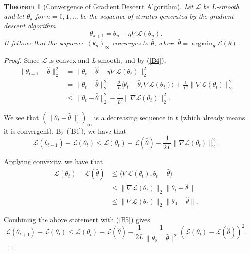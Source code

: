 \documentclass[a4paper,11pt,titlepage]{article}
\DeclareMathOperator*{\argmin}{argmin}
\theoremstyle{definition}
\theoremstyle{plain}
\newtheorem{theorem}{Theorem}[section]
\theoremstyle{remark}
\begin{document}
\begin{theorem}[Convergence of Gradient Descent Algorithm]
    Let $\mathcal{L}$ be $L$-smooth and let $\theta_n$ for $n = 0, 1, \dots$ be the sequence of iterates generated by the gradient descent algorithm
    $$
    \theta_{n+1} = \theta_{n} - \eta \nabla \mathcal{L}(\theta_n).
    $$
    It follows that the sequence $(\theta_n)_\infty$ converges to $\hat{\theta}$, where $\hat{\theta} = \argmin_\theta \mathcal{L}(\theta)$.
\end{theorem}
\begin{proof}
    Since $\mathcal{L}$ is convex and $L$-smooth, and by (\ref{B4}),
    \begin{align*}
        \|\theta_{t+1} - \hat{\theta}\|_2^2 &= \|\theta_{t} - \hat{\theta} - \eta \nabla \mathcal{L}(\theta_t)\|_2^2 \\
        &= \|\theta_{t} - \hat{\theta}\|_2^2 - \frac{2}{L}\langle \theta_t - \hat{\theta}, \nabla \mathcal{L}(\theta_t)\rangle + \frac{1}{L^2}\|\nabla \mathcal{L}(\theta_t)\|_2^2 \\
        &\leq \| \theta_t - \hat{\theta}\|_2^2 - \frac{1}{L^2}\|\nabla \mathcal{L}(\theta_t)\|_2^2.
    \end{align*}
    
    We see that $(\|\theta_t - \hat{\theta}\|_2^2)_\infty$ is a decreasing sequence in $t$ (which already means it is convergent). By (\ref{B1}), we have that
    \begin{equation}
    \mathcal{L}(\theta_{t+1}) - \mathcal{L}(\theta_t) \leq \mathcal{L}(\theta_t) - \mathcal{L}(\hat{\theta}) - \frac{1}{2L}\|\nabla \mathcal{L}(\theta_t) \|_2^2. \label{B5}
    \end{equation}
    
    Applying convexity, we have that
    \begin{align*}
        \mathcal{L}(\theta_t) - \mathcal{L}(\hat{\theta}) &\leq \langle \nabla \mathcal{L}(\theta_t), \theta_t - \hat{\theta} \rangle \\
        &\leq \| \nabla \mathcal{L}(\theta_t)\|_2 \| \theta_t - \hat{\theta} \| \\
        &\leq \| \nabla \mathcal{L}(\theta_t)\|_2 \| \theta_0 - \hat{\theta} \|.
    \end{align*}
    
    Combining the above statement with (\ref{B5}) gives
    \begin{equation}
        \mathcal{L}(\theta_{t+1}) - \mathcal{L}(\theta_{t}) \leq \mathcal{L}(\theta_{t}) - \mathcal{L}(\hat{\theta}) - \frac{1}{2L} \frac{1}{\| \theta_0 - \hat{\theta} \|^2}\left(\mathcal{L}(\theta_t) - \mathcal{L}(\hat{\theta})\right)^2. \label{B6}
    \end{equation}
    

\end{proof}
\end{document}
